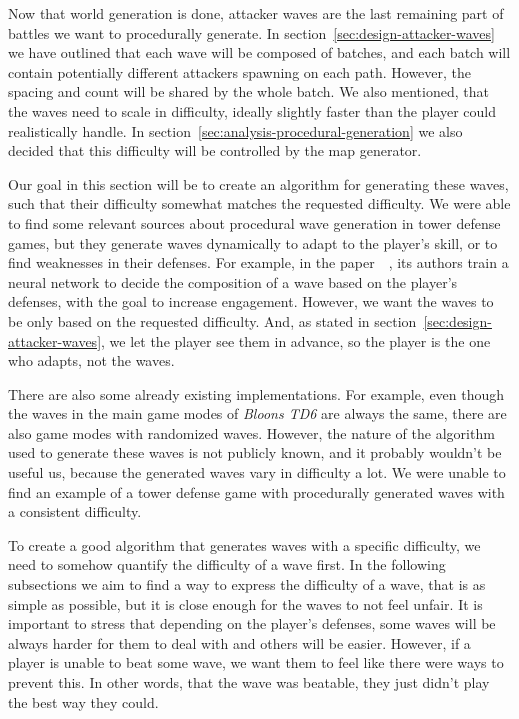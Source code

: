 Now that world generation is done, attacker waves are the last remaining part of battles we want to procedurally generate.
In section~\ref{sec:design-attacker-waves} we have outlined that each wave will be composed of batches, and each batch will contain potentially different attackers spawning on each path.
However, the spacing and count will be shared by the whole batch.
We also mentioned, that the waves need to scale in difficulty, ideally slightly faster than the player could realistically handle.
In section~\ref{sec:analysis-procedural-generation} we also decided that this difficulty will be controlled by the map generator.

Our goal in this section will be to create an algorithm for generating these waves, such that their difficulty somewhat matches the requested difficulty.
We were able to find some relevant sources about procedural wave generation in tower defense games, but they generate waves dynamically to adapt to the player's skill, or to find weaknesses in their defenses.
For example, in the paper~~\cite{NeatWaves}, its authors train a neural network to decide the composition of a wave based on the player's defenses, with the goal to increase engagement.
However, we want the waves to be only based on the requested difficulty.
And, as stated in section~\ref{sec:design-attacker-waves}, we let the player see them in advance, so the player is the one who adapts, not the waves.

There are also some already existing implementations.
For example, even though the waves in the main game modes of \emph{Bloons TD6} are always the same, there are also game modes with randomized waves.
However, the nature of the algorithm used to generate these waves is not publicly known, and it probably wouldn't be useful us, because the generated waves vary in difficulty a lot.
We were unable to find an example of a tower defense game with procedurally generated waves with a consistent difficulty.

To create a good algorithm that generates waves with a specific difficulty, we need to somehow quantify the difficulty of a wave first.
In the following subsections we aim to find a way to express the difficulty of a wave, that is as simple as possible, but it is close enough for the waves to not feel unfair.
It is important to stress that depending on the player's defenses, some waves will be always harder for them to deal with and others will be easier.
However, if a player is unable to beat some wave, we want them to feel like there were ways to prevent this.
In other words, that the wave was beatable, they just didn't play the best way they could.

